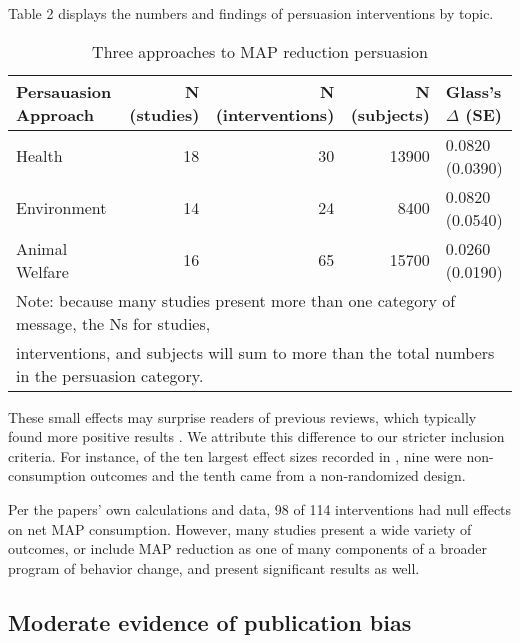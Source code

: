 \documentclass[sn-nature,pdflatex]{sn-jnl}
\begin{document}
Table 2 displays the numbers and findings of persuasion interventions by
topic.

\begin{table}[!h]
\centering
\caption{\label{tab:table_two}Three approaches to MAP reduction persuasion}
\centering
\begin{tabular}[t]{lrrrl}
\toprule
Persauasion Approach & N (studies) & N (interventions) & N (subjects) & Glass's $\Delta$ (SE)\\
\midrule
Health & 18 & 30 & 13900 & 0.0820 (0.0390)\\
Environment & 14 & 24 & 8400 & 0.0820 (0.0540)\\
Animal Welfare & 16 & 65 & 15700 & 0.0260 (0.0190)\\
\bottomrule
\multicolumn{5}{l}{\textsuperscript{} Note: because many studies present more than one category of message, the Ns for studies, \linebreak}\\
\multicolumn{5}{l}{interventions, and subjects will sum to more than the total numbers in the persuasion category.}\\
\end{tabular}
\end{table}

These small effects may surprise readers of previous reviews, which
typically found more positive results
\citep{mathur2021meta, meier2022, mertens2022}. We attribute this
difference to our stricter inclusion criteria. For instance, of the ten
largest effect sizes recorded in \citep{mathur2021effectiveness}, nine
were non-consumption outcomes and the tenth came from a non-randomized
design.

Per the papers' own calculations and data, 98 of 114 interventions had
null effects on net MAP consumption. However, many studies present a
wide variety of outcomes, or include MAP reduction as one of many
components of a broader program of behavior change, and present
significant results as well.

\begin{comment}
Could put this back in: "Using our calculations of effect size and standard error 15 interventions have 95%
\end{comment}

\subsection{Moderate evidence of publication bias}\label{sec2.2}
\end{document}
